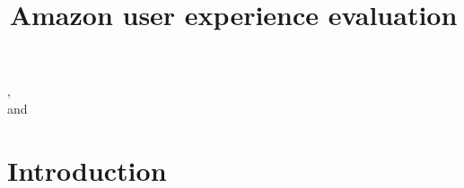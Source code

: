 \documentclass[fleqn]{IOS-Book-Article}
\begin{document}


\newpage

%
%
%

%

\pagestyle{plain}
\setcounter{page}{1}

\begin{frontmatter}    

\title{Amazon user experience evaluation}

\author{ }, \\ %
and
\author{ }

\address{Department of Computer Science, Aalborg University, Denmark}





%
\end{frontmatter}



\section{Introduction} \label{sec:introduction}

\end{document}
